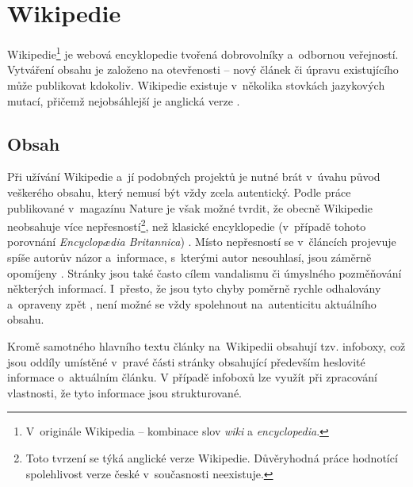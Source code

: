
\chapter{Wikipedie}
Wikipedie\footnote{V~originále Wikipedia -- kombinace slov \textit{wiki} a \textit{encyclopedia}.} je webová encyklopedie tvořená dobrovolníky a~odbornou veřejností. Vytváření obsahu je založeno na otevřenosti -- nový článek či úpravu existujícího může publikovat kdokoliv. Wikipedie existuje v~několika stovkách jazykových mutací, přičemž nejobsáhlejší je anglická verze \cite{listofwikis}.

\section{Obsah}
Při užívání Wikipedie a~jí podobných projektů je nutné brát v~úvahu původ veškerého obsahu, který nemusí být vždy zcela autentický. Podle práce publikované v~magazínu Nature je však možné tvrdit, že obecně Wikipedie neobsahuje více nepřesností\footnote{Toto tvrzení se týká anglické verze Wikipedie. Důvěryhodná práce hodnotící spolehlivost verze české v~současnosti neexistuje.}, než klasické encyklopedie (v~případě tohoto porovnání \textit{Encyclop\ae{}dia Britannica}) \cite{wikireliability1}. Místo nepřesností se v~článcích projevuje spíše autorův názor a~informace, s~kterými autor nesouhlasí, jsou záměrně opomíjeny \cite{wikireliability2}. Stránky jsou také často cílem vandalismu či úmyslného pozměňování některých informací. I~přesto, že jsou tyto chyby poměrně rychle odhalovány a~opraveny zpět \cite{wikirepair}, není možné se vždy spolehnout na~autenticitu aktuálního obsahu.

Kromě samotného hlavního textu články na~Wikipedii obsahují tzv. infoboxy, což jsou oddíly umístěné v~pravé části stránky obsahující především heslovité informace o~aktuálním článku. V případě infoboxů lze využít při zpracování vlastnosti, že tyto informace jsou strukturované.
 
 
 
 
